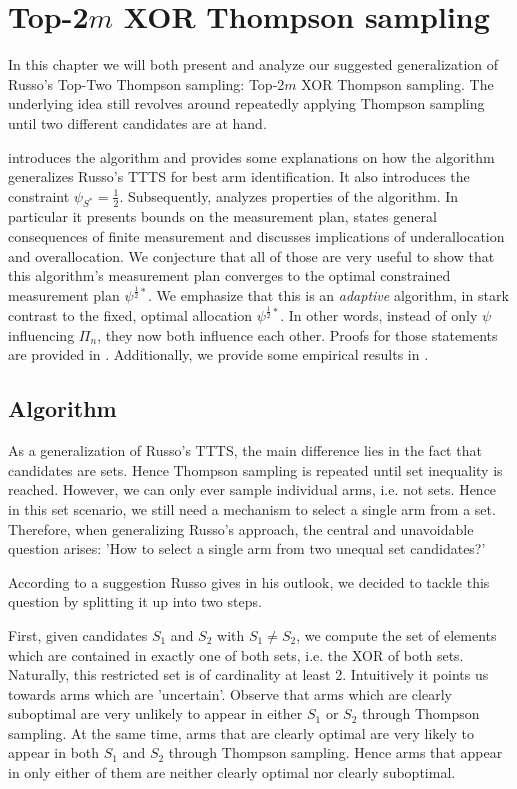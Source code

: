 \chapter{Top-2$m$ XOR Thompson sampling}\label{chapter:algorithm}

In this chapter we will both present and analyze our suggested generalization of
Russo's Top-Two Thompson sampling: Top-2$m$ XOR Thompson sampling. The
underlying idea still revolves around repeatedly applying Thompson sampling
until two different candidates are at hand.

 introduces the algorithm and provides some explanations
on how the algorithm generalizes Russo's TTTS for best arm identification. It
also introduces the constraint $\psi_{S^*} = \frac{1}{2}$. Subsequently,
 analyzes properties of the algorithm. In particular it
presents bounds on the measurement plan, states general consequences of finite
measurement and discusses implications of underallocation and overallocation. We
conjecture that all of those are very useful to show that this algorithm's
measurement plan converges to the optimal constrained measurement plan
$\psi^{\frac{1}{2}*}$. We emphasize that this is an \emph{adaptive} algorithm,
in stark contrast to the fixed, optimal allocation $\psi^{\frac{1}{2}*}$. In
other words, instead of only $\psi$ influencing $\Pi_n$, they now both influence
each other. Proofs for those statements are provided in
. Additionally, we provide some empirical results in
.

\section{Algorithm}\label{section:algorithm}
As a generalization of Russo's TTTS, the main difference lies in the fact that
candidates are sets. Hence Thompson sampling is repeated until set inequality is
reached. However, we can only ever sample individual arms, i.e. not sets. Hence
in this set scenario, we still need a mechanism to select a single arm from a
set. Therefore, when generalizing Russo's approach, the central and unavoidable
question arises: 'How to select a single arm from two unequal set candidates?'

According to a suggestion Russo gives in his outlook, we decided to tackle this
question by splitting it up into two steps.

First, given candidates $S_1$ and $S_2$ with $S_1 \neq S_2$, we compute the set
of elements which are contained in exactly one of both sets, i.e. the XOR of
both sets. Naturally, this restricted set is of cardinality at least 2.
Intuitively it points us towards arms which are 'uncertain'. Observe that arms
which are clearly suboptimal are very unlikely to appear in either $S_1$ or
$S_2$ through Thompson sampling. At the same time, arms that are clearly optimal
are very likely to appear in both $S_1$ and $S_2$ through Thompson sampling.
Hence arms that appear in only either of them are neither clearly optimal nor
clearly suboptimal.

